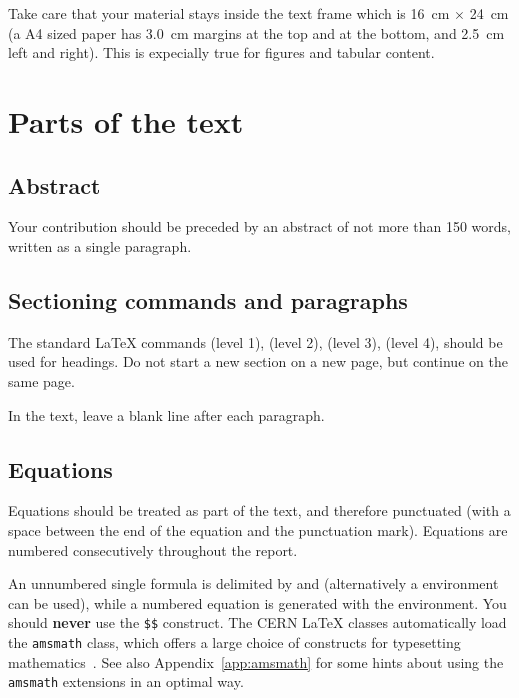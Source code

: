 \documentclass{cernyrep}
\begin{document}
Take care that your material stays inside the text frame which is
16~cm $\times$ 24~cm (\ie a A4 sized paper has 3.0~cm margins at the
top and at the bottom, and 2.5~cm left and right). This is expecially
true for figures and tabular content.

\section{Parts of the text}

\subsection{Abstract}

Your contribution should be preceded by an abstract of not more than
150 words, written as a single paragraph.


\subsection{Sectioning commands and paragraphs}
\label{sec:sections}

The standard \LaTeX{} commands  (level 1),
 (level 2),  (level 3),
 (level 4), should be used for headings.  Do not
start a new section on a new page, but continue on the same page.

In the text, leave a blank line after each paragraph.

\subsection{Equations}
\label{sec:equations}

Equations should be treated as part of the text, and therefore
punctuated (with a space between the end of the equation and the
punctuation mark).  Equations are numbered consecutively throughout
the report. 

An unnumbered single formula is delimited by \Lcs{[} and \Lcs{]}
(alternatively a  environment can be used), while a
numbered equation is generated with the  environment.
You should \textbf{never} use the \texttt{\$\$} construct.  The CERN
\LaTeX{} classes automatically load the \texttt{amsmath} class, which
offers a large choice of constructs for typesetting
mathematics~\cite{bib:voss2005}. See also Appendix~\ref{app:amsmath}
for some hints about using the \texttt{amsmath} extensions in an
optimal way.
\end{document}
